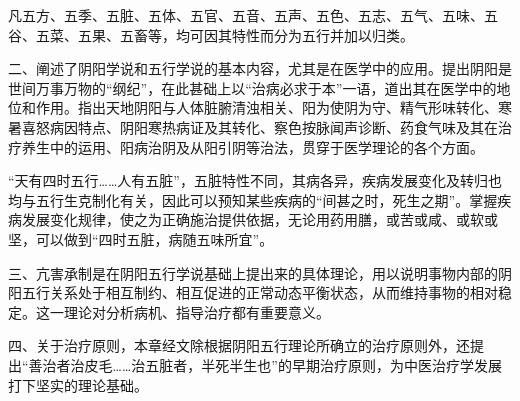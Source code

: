 \documentclass[12pt]{ctexbook}
\begin{document}
凡五方、五季、五脏、五体、五官、五音、五声、五色、五志、五气、五味、五谷、五菜、五果、五畜等，均可因其特性而分为五行并加以归类。

二、阐述了阴阳学说和五行学说的基本内容，尤其是在医学中的应用。提出阴阳是世间万事万物的“纲纪”，在此甚础上以“治病必求于本”一语，道出其在医学中的地位和作用。指出天地阴阳与人体脏腑清浊相关、阳为使阴为守、精气形味转化、寒暑喜怒病因特点、阴阳寒热病证及其转化、察色按脉闻声诊断、药食气味及其在治疗养生中的运用、阳病治阴及从阳引阴等治法，贯穿于医学理论的各个方面。

“天有四时五行……人有五脏”，五脏特性不同，其病各异，疾病发展变化及转归也均与五行生克制化有关，因此可以预知某些疾病的“间甚之时，死生之期”。掌握疾病发展变化规律，使之为正确施治提供依据，无论用药用膳，或苦或咸、或软或坚，可以做到“四时五脏，病随五味所宜”。

三、亢害承制是在阴阳五行学说基础上提出来的具体理论，用以说明事物内部的阴阳五行关系处于相互制约、相互促进的正常动态平衡状态，从而维持事物的相对稳定。这一理论对分析病机、指导治疗都有重要意义。

四、关于治疗原则，本章经文除根据阴阳五行理论所确立的治疗原则外，还提出“善治者治皮毛……治五脏者，半死半生也”的早期治疗原则，为中医治疗学发展打下坚实的理论基础。

\ifx \allfiles \undefined
\end{document}

